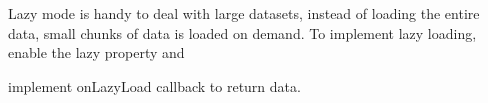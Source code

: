 
Lazy mode is handy to deal with large datasets, instead of loading the entire data, 
small chunks of data is loaded on demand. To implement lazy loading, enable the lazy property 
and 

implement onLazyLoad callback to return data.